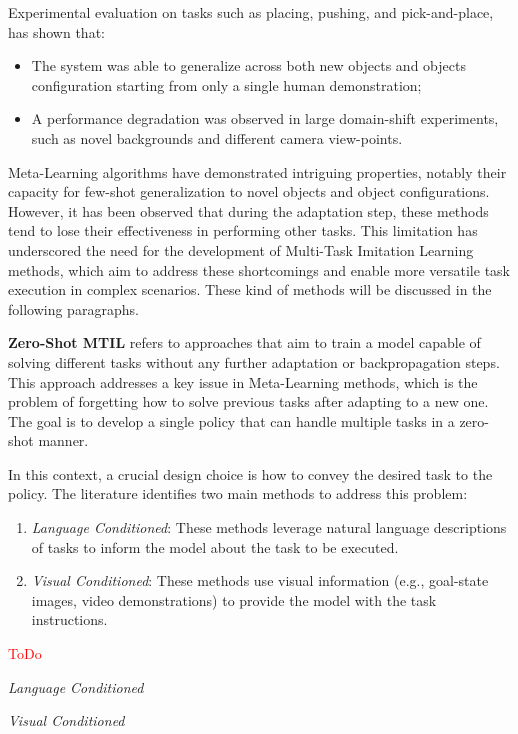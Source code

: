 
\newline Experimental evaluation on tasks such as placing, pushing, and pick-and-place, has shown that: \begin{itemize}
    \item The system was able to generalize across both new objects and objects configuration starting from only a single human demonstration;
    \item A performance degradation was observed in large domain-shift experiments, such as novel backgrounds and different camera view-points.
\end{itemize}


Meta-Learning algorithms have demonstrated intriguing properties, notably their capacity for few-shot generalization to novel objects and object configurations. However, it has been observed that during the adaptation step, these methods tend to lose their effectiveness in performing other tasks. This limitation has underscored the need for the development of Multi-Task Imitation Learning methods, which aim to address these shortcomings and enable more versatile task execution in complex scenarios. These kind of methods will be discussed in the following paragraphs.

\textbf{Zero-Shot MTIL} refers to approaches that aim to train a model capable of solving different tasks without any further adaptation or backpropagation steps. This approach addresses a key issue in Meta-Learning methods, which is the problem of forgetting how to solve previous tasks after adapting to a new one. The goal is to develop a single policy that can handle multiple tasks in a zero-shot manner.

In this context, a crucial design choice is how to convey the desired task to the policy. The literature identifies two main methods to address this problem:

\begin{enumerate}
    \item \textit{Language Conditioned}: These methods leverage natural language descriptions of tasks to inform the model about the task to be executed.
    \item \textit{Visual Conditioned}: These methods use visual information (e.g., goal-state images, video demonstrations) to provide the model with the task instructions.
\end{enumerate}
\textcolor{red}{ToDo}

\textit{Language Conditioned}

\textit{Visual Conditioned}